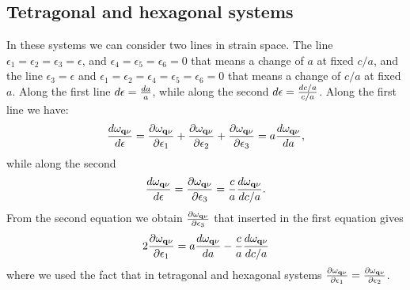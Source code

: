 \documentclass[12pt,a4paper]{article}
\begin{document}
\subsection{\color{web-blue}Tetragonal and hexagonal systems}
In these systems we can consider two lines in strain space. 
The line $\epsilon_1=\epsilon_2=\epsilon_3=\epsilon$, and
$\epsilon_4=\epsilon_5=\epsilon_6=0$ that means a change of $a$ at fixed
$c/a$, and the line $\epsilon_3=\epsilon$ and 
$\epsilon_1=\epsilon_2=\epsilon_4=\epsilon_5 =\epsilon_6=0$ that means 
a change of $c/a$ at fixed $a$.
Along the first line $d\epsilon={d a \over a}$, while along the second
$d\epsilon={d c/a \over c/a}$.
Along the first line we have:
\begin{equation}
{d \omega_{{\bf q}\nu} \over d \epsilon} = {\partial \omega_{{\bf q}\nu} 
\over \partial \epsilon_1} + {\partial \omega_{{\bf q}\nu} 
\over \partial \epsilon_2} + {\partial \omega_{{\bf q}\nu} 
\over \partial \epsilon_3} = a {d \omega_{{\bf q}\nu} 
\over d a},
\end{equation}
while along the second
\begin{equation}
{d \omega_{{\bf q}\nu} \over d \epsilon} = {\partial \omega_{{\bf q}\nu} 
\over \partial \epsilon_3} = {c\over a} {d \omega_{{\bf q}\nu} 
\over d c/a}.
\end{equation}
From the second equation we obtain ${\partial \omega_{{\bf q}\nu} 
\over \partial \epsilon_3}$ that inserted in the first equation gives
\begin{equation}
2 {\partial \omega_{{\bf q}\nu} \over \partial \epsilon_1} = a  
{d \omega_{{\bf q}\nu} \over d a} -
{c\over a} {d \omega_{{\bf q}\nu} \over d c/a}
\end{equation}
where we used the fact that in tetragonal and hexagonal systems
${\partial \omega_{{\bf q}\nu} \over \partial \epsilon_1}
={\partial \omega_{{\bf q}\nu} \over \partial \epsilon_2}$.
 
\end{document}
